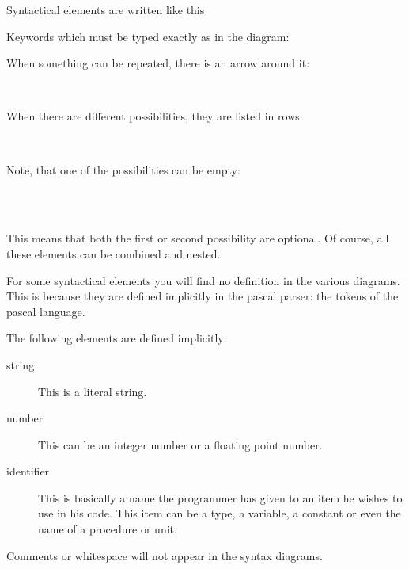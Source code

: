 Syntactical elements are written like this
\begin{mysyntdiag}
\end{mysyntdiag}
Keywords which must be typed exactly as in the diagram:
\begin{mysyntdiag}
\end{mysyntdiag}
When something can be repeated, there is an arrow around it:
\begin{mysyntdiag}
\begin{rep}[b]  \\ \end{rep}
\end{mysyntdiag}
When there are different possibilities, they are listed in rows:
\begin{mysyntdiag}
\begin{stack}
 \\
\end{stack}
\end{mysyntdiag}
Note, that one of the possibilities can be empty:
\begin{mysyntdiag}
\begin{stack}\\
 \\
\end{stack}
\end{mysyntdiag}
This means that both the first or second possibility are optional.
Of course, all these elements can be combined and nested.

For some syntactical elements you will find no definition in the various diagrams. 
This is because they are defined implicitly in the pascal parser: the tokens of the pascal language.

The following elements are defined implicitly:
\begin{description}
\item[string] This is a literal string. 
\item[number] This can be an integer number or a floating point number.
\item[identifier] This is basically a name the programmer has given to an item he wishes to use in his code.
This item can be a type, a variable, a constant or even the name of a procedure or unit.
\end{description}
Comments or whitespace will not appear in the syntax diagrams.

